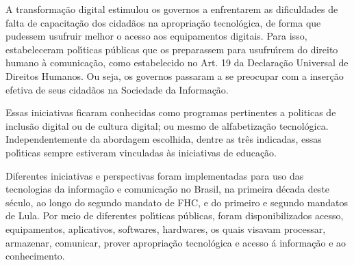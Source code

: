 \documentclass[
12pt,		%
openright,	%
twoside,  %
a4paper,			%
chapter=TITLE,		%
english,			%
french,				%
spanish,			%
brazil				%
]{USPSC-classe/USPSC}
\begin{document}
A transforma\c{c}\~ao digital estimulou os governos a enfrentarem as dificuldades  de falta de  capacita\c{c}\~ao dos cidad\~aos na apropria\c{c}\~ao tecnol\'ogica, de forma que pudessem usufruir melhor o acesso aos equipamentos digitais. Para isso, estabeleceram pol\'{\i}ticas p\'ublicas que os preparassem para usufru\'{\i}rem do direito humano \`a comunica\c{c}\~ao, como estabelecido no Art. 19 da Declara\c{c}\~ao Universal de Direitos Humanos. Ou seja, os governos passaram a se preocupar com a inser\c{c}\~ao efetiva de seus cidad\~aos na Sociedade da Informa\c{c}\~ao.

















Essas iniciativas ficaram conhecidas como programas pertinentes a politicas de \textquotedbl inclus\~ao digital ou  de \textquotedbl cultura digital\textquotedbl ; ou mesmo de \textquotedbl alfabetiza\c{c}\~ao tecnol\'ogica\textquotedbl . Independentemente da abordagem escolhida, dentre as tr\^es indicadas, essas pol\'{\i}ticas sempre estiveram vinculadas \`as iniciativas de educa\c{c}\~ao.

















Diferentes iniciativas e perspectivas foram implementadas para uso das tecnologias da informa\c{c}\~ao e comunica\c{c}\~ao no Brasil, na primeira d\'ecada deste s\'eculo, ao longo do segundo mandato de FHC, e do primeiro e segundo mandatos de Lula. Por meio de diferentes pol\'{\i}ticas p\'ublicas, foram disponibilizados acesso, equipamentos, aplicativos, softwares, hardwares, os quais visavam processar, armazenar, comunicar, prover apropria\c{c}\~ao tecnol\'ogica e acesso \'a informa\c{c}\~ao e ao conhecimento.
\end{document}
